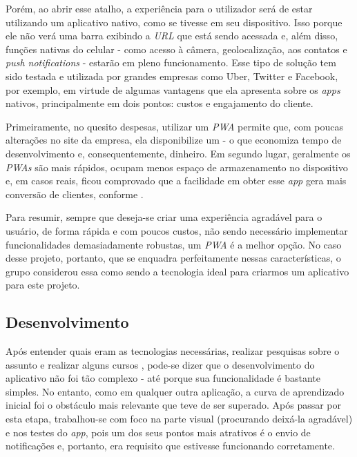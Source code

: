 Porém, ao abrir esse atalho, a experiência para o utilizador será de estar utilizando um aplicativo nativo, como se tivesse  em seu dispositivo. Isso porque ele não verá uma barra exibindo a \textit{URL} que está sendo acessada e, além disso, funções nativas do celular - como acesso à câmera, geolocalização, aos contatos e \textit{push notifications} - estarão em pleno funcionamento. Esse tipo de solução tem sido testada e utilizada por grandes empresas como Uber, Twitter e Facebook, por exemplo, em virtude de algumas vantagens que ela apresenta sobre os \textit{apps} nativos, principalmente em dois pontos: custos e engajamento do cliente.


Primeiramente, no quesito despesas, utilizar um \textit{PWA} permite que, com poucas alterações no site da empresa, ela disponibilize um  - o que economiza tempo de desenvolvimento e, consequentemente, dinheiro. Em segundo lugar, geralmente os \textit{PWAs} são mais rápidos, ocupam menos espaço de armazenamento no dispositivo e, em casos reais, ficou comprovado que a facilidade em obter esse \textit{app} gera mais conversão de clientes, conforme \cite{Souza19} .

Para resumir, sempre que deseja-se criar uma experiência agradável para o usuário, de forma rápida e com poucos custos, não sendo necessário implementar funcionalidades demasiadamente robustas, um \textit{PWA} é a melhor opção. No caso desse projeto, portanto, que se enquadra perfeitamente nessas características, o grupo considerou essa como sendo a tecnologia ideal para criarmos um aplicativo para este projeto.


\subsection{Desenvolvimento}
\label{subsec:desenvolvimento}

Após entender quais eram as tecnologias necessárias, realizar pesquisas sobre o assunto e realizar alguns cursos \online{}, pode-se dizer que o desenvolvimento do aplicativo não foi tão complexo - até porque sua funcionalidade é bastante simples. No entanto, como em qualquer outra aplicação, a curva de aprendizado inicial foi o obstáculo mais relevante que teve de ser superado. Após passar por esta etapa, trabalhou-se com foco na parte visual (procurando deixá-la agradável) e nos testes do \textit{app}, pois um dos seus pontos mais atrativos é o envio de notificações e, portanto, era requisito que estivesse funcionando corretamente. 

